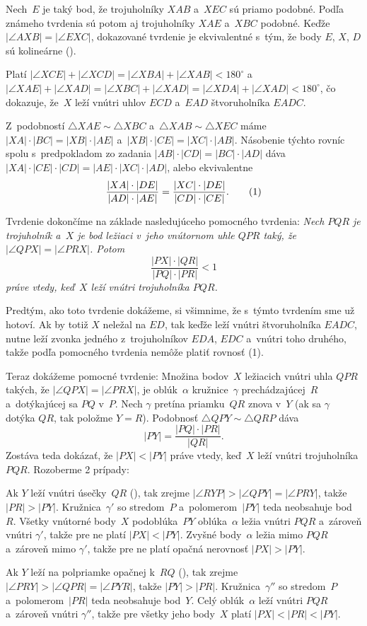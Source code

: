 {%
Nech~$E$ je taký bod, že trojuholníky $XAB$ a~$XEC$ sú priamo podobné. Podľa známeho tvrdenia sú potom aj trojuholníky $XAE$ a~$XBC$ podobné. Keďže $|\angle AXB|=|\angle EXC|$, dokazované tvrdenie je ekvivalentné s~tým, že body $E$, $X$, $D$ sú kolineárne (\obr).

Platí $|\angle XCE| + |\angle XCD| = |\angle XBA|+|\angle XAB|<180^\circ$ a~$|\angle XAE| + |\angle XAD| = |\angle XBC|+|\angle XAD|=|\angle XDA|+|\angle XAD|<180^\circ$, čo dokazuje, že~$X$ leží vnútri uhlov $ECD$ a~$EAD$ štvoruholníka $EADC$.
%

Z~podobností $\triangle XAE \sim \triangle XBC$ a~$\triangle XAB \sim \triangle XEC$ máme $|XA| \cdot |BC| = {|XB| \cdot |AE|}$ a~$|XB| \cdot |CE| = |XC| \cdot |AB|$. Násobenie týchto rovníc spolu s~predpokladom zo zadania $|AB|\cdot|CD|=|BC|\cdot|AD|$ dáva $|XA| \cdot |CE| \cdot |CD| = |AE| \cdot |XC| \cdot |AD|$, alebo ekvivalentne
$$
\frac{|XA| \cdot |DE|}{|AD|\cdot |AE|}=\frac{|XC| \cdot |DE|}{|CD| \cdot |CE|}.
\tag1
$$

Tvrdenie dokončíme na základe nasledujúceho pomocného tvrdenia: {\sl Nech $PQR$ je trojuholník a~$X$ je bod ležiaci v~jeho vnútornom uhle $QPR$ taký, že $|\angle QPX|=|\angle PRX|$. Potom
$$
\frac{|PX| \cdot |QR|}{|PQ| \cdot |PR|}<1
$$
práve vtedy, keď~$X$ leží vnútri trojuholníka $PQR$.}

Predtým, ako toto tvrdenie dokážeme, si všimnime, že s~týmto tvrdením sme už hotoví. Ak by totiž $X$ neležal na $ED$, tak keďže leží vnútri štvoruholníka $EADC$, nutne leží zvonka jedného z~trojuholníkov $EDA$, $EDC$ a~vnútri toho druhého, takže podľa pomocného tvrdenia nemôže platiť rovnosť (1).

Teraz dokážeme pomocné tvrdenie: Množina bodov~$X$ ležiacich vnútri uhla $QPR$ takých, že $|\angle QPX|=|\angle PRX|$, je oblúk~$\alpha$ kružnice~$\gamma$ prechádzajúcej~$R$ a~dotýkajúcej sa $PQ$ v~$P$. Nech $\gamma$ pretína priamku~$QR$ znova v~$Y$ (ak sa $\gamma$ dotýka $QR$, tak položme $Y=R$). Podobnosť $\triangle QPY \sim \triangle QRP$ dáva
$$
|PY|=\frac{|PQ|\cdot |PR|}{|QR|}.
$$
Zostáva teda dokázať, že $|PX|<|PY|$ práve vtedy, keď~$X$ leží vnútri trojuholníka $PQR$. Rozoberme 2 prípady:

Ak $Y$ leží vnútri úsečky~$QR$ (\obr), tak zrejme $|\angle RYP|>|\angle QPY|=|\angle PRY|$, takže $|PR|>|PY|$. Kružnica~$\gamma'$ so stredom~$P$ a~polomerom~$|PY|$ teda neobsahuje bod~$R$. Všetky vnútorné body~$X$ podoblúka~$PY$ oblúka~$\alpha$ ležia vnútri $PQR$ a~zároveň vnútri $\gamma'$, takže pre ne platí $|PX|<|PY|$. Zvyšné body~$\alpha$ ležia mimo $PQR$ a~zároveň mimo $\gamma'$, takže pre ne platí opačná nerovnosť $|PX|>|PY|$.

Ak $Y$ leží na polpriamke opačnej k~$RQ$ (\obr), tak zrejme $|\angle PRY|>|\angle QPR|=|\angle PYR|$, takže $|PY|>|PR|$. Kružnica~$\gamma''$ so stredom~$P$ a~polomerom~$|PR|$ teda neobsahuje bod~$Y$. Celý oblúk~$\alpha$ leží vnútri $PQR$ a~zároveň vnútri $\gamma''$, takže pre všetky jeho body~$X$ platí $|PX|<|PR|<|PY|$.
}

